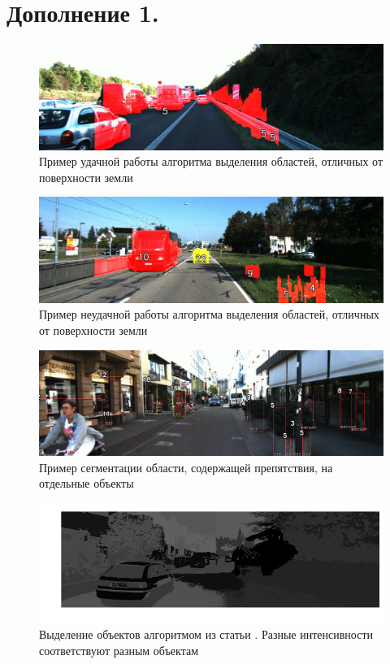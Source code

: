 \documentclass[aps,%
14pt,%
final,%
oneside,
onecolumn,%
musixtex, %
superscriptaddress,%
centertags]{extarticle} %
\begin{document}
\section{Дополнение 1.}
\begin{figure}[h]
     \includegraphics[width=\textwidth]{basic_vdisparity_good.png}
     \caption{Пример удачной работы алгоритма выделения областей, отличных от поверхности земли }
     \label{fig:basic_vdisparity_good}
\end{figure}
\begin{figure}[]
     \includegraphics[width=\textwidth]{basic_vdisparity.png}
     \caption{Пример неудачной работы алгоритма выделения областей, отличных от поверхности земли }
     \label{fig:basic_vdisparity}
\end{figure}
\begin{figure}[]
     \includegraphics[width=\textwidth]{stixel_boxes.png}
     \caption{Пример сегментации области, содержащей препятствия, на отдельные объекты }
     \label{fig:stixel_boxes}
\end{figure}
\begin{figure}[]
     \includegraphics[width=\textwidth]{download.png}
     \caption{Выделение объектов алгоритмом из статьи \cite{franke20056d}. Разные интенсивности соответствуют разным объектам}
     \label{fig:6d}
\end{figure}
\end{document}
